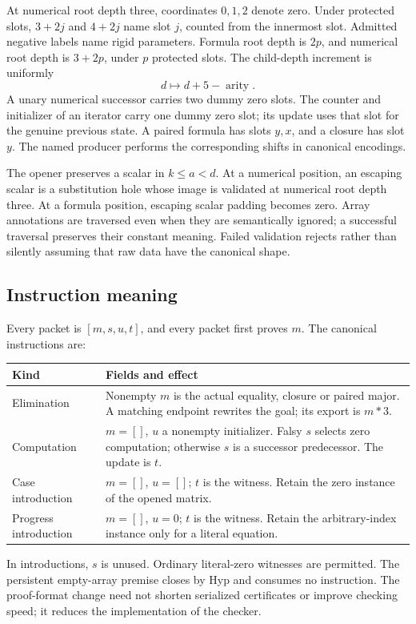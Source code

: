 \documentclass[11pt,letterpaper]{article}
\theoremstyle{definition}\newtheorem{definition}[theorem]{Definition}
\theoremstyle{remark}\newtheorem{remark}[theorem]{Remark}
\begin{document}
At numerical root depth three, coordinates \(0,1,2\) denote zero.
Under protected slots, \(3+2j\) and \(4+2j\) name slot \(j\),
counted from the innermost slot. Admitted negative labels name rigid
parameters. Formula root depth is \(2p\), and numerical root depth
is \(3+2p\), under \(p\) protected slots. The child-depth increment
is uniformly
\[
                  d\longmapsto d+5-\operatorname{arity}.
\]
A unary numerical successor carries two dummy zero slots. The counter
and initializer of an iterator carry one dummy zero slot; its update
uses that slot for the genuine previous state. A paired formula has
slots \(y,x\), and a closure has slot \(y\). The named producer
performs the corresponding shifts in canonical encodings.

The opener preserves a scalar in \(k\le a<d\). At a numerical
position, an escaping scalar is a substitution hole whose image is
validated at numerical root depth three. At a formula position,
escaping scalar padding becomes zero. Array annotations are traversed
even when they are semantically ignored; a successful traversal preserves
their constant meaning. Failed validation rejects rather than silently
assuming that raw data have the canonical shape.

\subsection{Instruction meaning}

Every packet is \([m,s,u,t]\), and every packet first proves \(m\).
The canonical instructions are:
\begin{center}\small
\begin{tabularx}{\linewidth}{lX}\toprule
Kind & Fields and effect\\\midrule
Elimination & Nonempty \(m\) is the actual equality, closure or paired
major. A matching endpoint rewrites the goal; its export is \(m*3\).\\
Computation & \(m=[]\), \(u\) a nonempty initializer. Falsy \(s\)
selects zero computation; otherwise \(s\) is a successor predecessor.
The update is \(t\).\\
Case introduction & \(m=[]\), \(u=[]\); \(t\) is the witness.
Retain the zero instance of the opened matrix.\\
Progress introduction & \(m=[]\), \(u=0\); \(t\) is the witness.
Retain the arbitrary-index instance only for a literal equation.\\\bottomrule
\end{tabularx}
\end{center}
In introductions, \(s\) is unused. Ordinary literal-zero witnesses
are permitted. The persistent empty-array premise closes by Hyp and
consumes no instruction. The proof-format change need not shorten
serialized certificates or improve checking speed; it reduces the
implementation of the checker.
\end{document}
